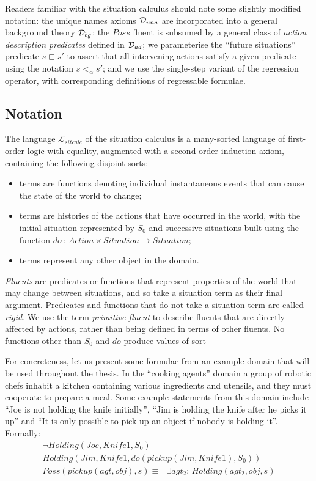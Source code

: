 Readers familiar with the situation calculus should note some slightly
modified notation: the unique names axioms $\mathcal{D}_{una}$ are incorporated
into a general background theory $\mathcal{D}_{bg}$; the $Poss$ fluent is
subsumed by a general class of \emph{action description predicates}
defined in $\mathcal{D}_{ad}$; we parameterise the {}``future situations''
predicate $s\sqsubset s'$ to assert that all intervening actions
satisfy a given predicate using the notation $s<_{\alpha}s'$; and
we use the single-step variant of the regression operator, with corresponding
definitions of regressable formulae.


\subsection{Notation\label{sec:Background:SC:Notation}}

The language $\mathcal{L}_{sitcalc}$ of the situation calculus is
a many-sorted language of first-order logic with equality, augmented
with a second-order induction axiom, containing the following disjoint
sorts:

\begin{itemize}
\item \emph{} terms are functions denoting individual instantaneous
events that can cause the state of the world to change; 
\item {} terms are histories of the actions that have occurred
in the world, with the initial situation represented by $S_{0}$ and
successive situations built using the function $do\,:\, Action\times Situation\rightarrow Situation$; 
\item {} terms represent any other object in the domain. 
\end{itemize}
\emph{Fluents} are predicates or functions that represent properties
of the world that may change between situations, and so take a situation
term as their final argument. Predicates and functions that do not
take a situation term are called \emph{rigid}. We use the term \emph{primitive
fluent} to describe fluents that are directly affected by actions,
rather than being defined in terms of other fluents. No functions
other than $S_{0}$ and $do$ produce values of sort 

For concreteness, let us present some formulae from an example domain
that will be used throughout the thesis. In the {}``cooking agents''
domain a group of robotic chefs inhabit a kitchen containing various
ingredients and utensils, and they must cooperate to prepare a meal.
Some example statements from this domain include {}``Joe is not holding
the knife initially'', {}``Jim is holding the knife after he picks
it up'' and {}``It is only possible to pick up an object if nobody
is holding it''. Formally:\begin{gather*}
\neg Holding(Joe,Knife1,S_{0})\\
Holding(Jim,Knife1,do(pickup(Jim,Knife1),S_{0}))\\
Poss(pickup(agt,obj),s)\equiv\neg\exists agt_{2}:\, Holding(agt_{2},obj,s)\end{gather*}


